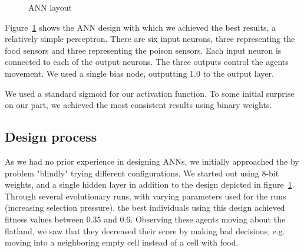 \documentclass[twoside]{article}
\begin{document}
\begin{multicols}{2}
\begin{figure}[H]

    \caption{ANN layout} \label{fig:ann-layout}
  \end{figure}

  Figure~\ref{fig:ann-layout} shows the ANN design with which we achieved the best results,
  a relatively simple perceptron.
  There are six input neurons, three representing the food sensors and three representing the poison sensors.
  Each input neuron is connected to each of the output neurons.
  The three outputs control the agents movement.
  We used a single bias node, outputting $1.0$ to the output layer.

  We used a standard sigmoid for our activation function.
  To some initial surprise on our part, we achieved the most consistent results using binary weights.

  \subsection{Design process}

  As we had no prior experience in designing ANNs,
  we initially approached the by problem "blindly" trying different configurations.
  We started out using 8-bit weights,
  and a single hidden layer in addition to the design depicted in figure~\ref{fig:ann-layout}.
  Through several evolutionary runs, with varying parameters used for the runs (increasing selection pressure),
  the best individuals using this design achieved fitness values between $0.35$ and $0.6$.
  Observing these agents moving about the flatland,
  we saw that they decreased their score by making bad decisions,
  e.g. moving into a neighboring empty cell instead of a cell with food.


\end{multicols}
\end{document}
